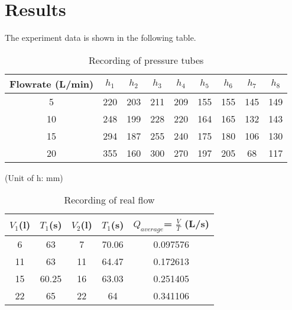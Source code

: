 \section{Results}
\label{sec:results}

The experiment data is shown in the following table.

\begin{table}[h]
    \centering
    \begin{tabular}{c|cccccccc}
    \hline
    Flowrate (L/min)   & $h_1$   & $h_2$   & $h_3$  & $h_4$  & $h_5$  & $h_6$  & $h_7$  & $h_8$  \\ \hline
    5  & 220 & 203 & 211 & 209 & 155 & 155 & 145 & 149 \\
    10 & 248 & 199 & 228 & 220 & 164 & 165 & 132 & 143 \\
    15 & 294 & 187 & 255 & 240 & 175 & 180 & 106 & 130 \\
    20 & 355 & 160 & 300 & 270 & 197 & 205 & 68  & 117 \\ \hline
    \end{tabular}

    (Unit of h: mm)
    \caption{Recording of pressure tubes}
    \label{Bt2}
\end{table}

\begin{table}[h]
    \centering
\begin{tabular}{ccccc}
    \toprule
    $V_1$(l)  & $T_1$(s)&  $V_2$(l)   & $T_1$(s)& $Q_{average} $= $\frac{V}{T}$ (L/s)  \\
    \midrule
6  & 63    & 7  & 70.06 &  0.097576 \\
11 & 63    & 11 & 64.47 &  0.172613 \\
15 & 60.25 & 16 & 63.03 &  0.251405 \\
22 & 65    & 22 & 64    &  0.341106 \\
    \bottomrule
\end{tabular}
\caption{Recording of real flow}
\label{Bt3}
\end{table}
































\FloatBarrier %



